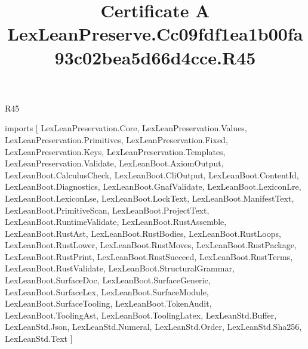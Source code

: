 \begin{lexlean}{R45}
\title{Certificate A LexLeanPreserve.Cc09fdf1ea1b00fa93c02bea5d66d4cce.R45}
\begin{coremodule}
imports [
  LexLeanPreservation.Core,
  LexLeanPreservation.Values,
  LexLeanPreservation.Primitives,
  LexLeanPreservation.Fixed,
  LexLeanPreservation.Keys,
  LexLeanPreservation.Templates,
  LexLeanPreservation.Validate,
  LexLeanBoot.AxiomOutput,
  LexLeanBoot.CalculusCheck,
  LexLeanBoot.CliOutput,
  LexLeanBoot.ContentId,
  LexLeanBoot.Diagnostics,
  LexLeanBoot.GnafValidate,
  LexLeanBoot.LexiconLre,
  LexLeanBoot.LexiconLse,
  LexLeanBoot.LockText,
  LexLeanBoot.ManifestText,
  LexLeanBoot.PrimitiveScan,
  LexLeanBoot.ProjectText,
  LexLeanBoot.RuntimeValidate,
  LexLeanBoot.RustAssemble,
  LexLeanBoot.RustAst,
  LexLeanBoot.RustBodies,
  LexLeanBoot.RustLoops,
  LexLeanBoot.RustLower,
  LexLeanBoot.RustMoves,
  LexLeanBoot.RustPackage,
  LexLeanBoot.RustPrint,
  LexLeanBoot.RustSucceed,
  LexLeanBoot.RustTerms,
  LexLeanBoot.RustValidate,
  LexLeanBoot.StructuralGrammar,
  LexLeanBoot.SurfaceDoc,
  LexLeanBoot.SurfaceGeneric,
  LexLeanBoot.SurfaceLex,
  LexLeanBoot.SurfaceModule,
  LexLeanBoot.SurfaceTooling,
  LexLeanBoot.TokenAudit,
  LexLeanBoot.ToolingAst,
  LexLeanBoot.ToolingLatex,
  LexLeanStd.Buffer,
  LexLeanStd.Json,
  LexLeanStd.Numeral,
  LexLeanStd.Order,
  LexLeanStd.Sha256,
  LexLeanStd.Text
]


\end{coremodule}
\end{lexlean}
